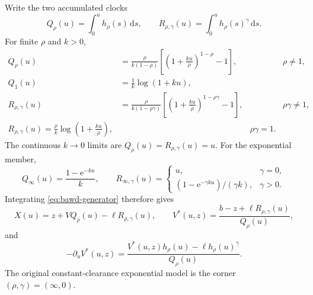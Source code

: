 \documentclass[12pt]{article}
\newcommand{\dd}{\,\mathrm{d}}
\newcommand{\e}{\mathrm{e}}
\theoremstyle{remark}
\begin{document}
Write the two accumulated clocks
\begin{equation}
 Q_\rho(u)=\int_0^u h_\rho(s)\dd s,\qquad
 R_{\rho,\gamma}(u)=\int_0^u h_\rho(s)^\gamma\dd s.
 \label{eq:bawd-clocks}
\end{equation}
For finite $\rho$ and $k>0$,
\begin{align}
 Q_\rho(u)
 &= \frac{\rho}{k(1-\rho)}
    \left[\left(1+\frac{ku}{\rho}\right)^{1-\rho}-1\right],
 && \rho\ne1, \nonumber\\
 Q_1(u)&=\frac{1}{k}\log(1+ku),&& \nonumber\\
 R_{\rho,\gamma}(u)
 &= \frac{\rho}{k(1-\rho\gamma)}
    \left[\left(1+\frac{ku}{\rho}\right)^{1-\rho\gamma}-1\right],
 && \rho\gamma\ne1, \nonumber\\
R_{\rho,\gamma}(u)=\frac{\rho}{k}\log\left(1+\frac{ku}{\rho}\right),
&& \rho\gamma=1.
 \label{eq:bawd-finite-clocks}
\end{align}
The continuous $k\to0$ limits are $Q_\rho(u)=R_{\rho,\gamma}(u)=u$. For the exponential member,
\begin{equation}
 Q_\infty(u)=\frac{1-\e^{-ku}}{k},\qquad
 R_{\infty,\gamma}(u)=
 \begin{cases}
   u,&\gamma=0,\\
   (1-\e^{-\gamma ku})/(\gamma k),&\gamma>0.
 \end{cases}
 \label{eq:bawd-exponential-clocks}
\end{equation}
Integrating \eqref{eq:bawd-generator} therefore gives
\begin{equation}
 X(u)=z+VQ_\rho(u)-\ell R_{\rho,\gamma}(u),\qquad
 V^*(u,z)=\frac{b-z+\ell R_{\rho,\gamma}(u)}{Q_\rho(u)},
 \label{eq:bawd-traj}
\end{equation}
and
\begin{equation}
 -\partial_u V^*(u,z)
 =\frac{V^*(u,z)h_\rho(u)-\ell h_\rho(u)^\gamma}{Q_\rho(u)}.
 \label{eq:bawd-vstar}
\end{equation}
The original constant-clearance exponential model is the corner $(\rho,\gamma)=(\infty,0)$.
\end{document}
